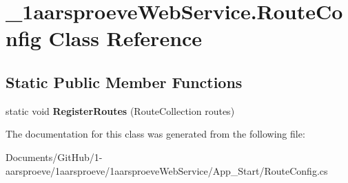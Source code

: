 \hypertarget{class__1aarsproeve_web_service_1_1_route_config}{}\section{\+\_\+1aarsproeve\+Web\+Service.\+Route\+Config Class Reference}
\label{class__1aarsproeve_web_service_1_1_route_config}
\subsection*{Static Public Member Functions}
\begin{DoxyCompactItemize}
\item 
\hypertarget{class__1aarsproeve_web_service_1_1_route_config_a2e7e1e761cec2f6d6ff22df4340a30d0}{}static void {\bfseries Register\+Routes} (Route\+Collection routes)\label{class__1aarsproeve_web_service_1_1_route_config_a2e7e1e761cec2f6d6ff22df4340a30d0}

\end{DoxyCompactItemize}


The documentation for this class was generated from the following file\+:\begin{DoxyCompactItemize}
\item 
Documents/\+Git\+Hub/1-\/aarsproeve/1aarsproeve/1aarsproeve\+Web\+Service/\+App\+\_\+\+Start/Route\+Config.\+cs\end{DoxyCompactItemize}
